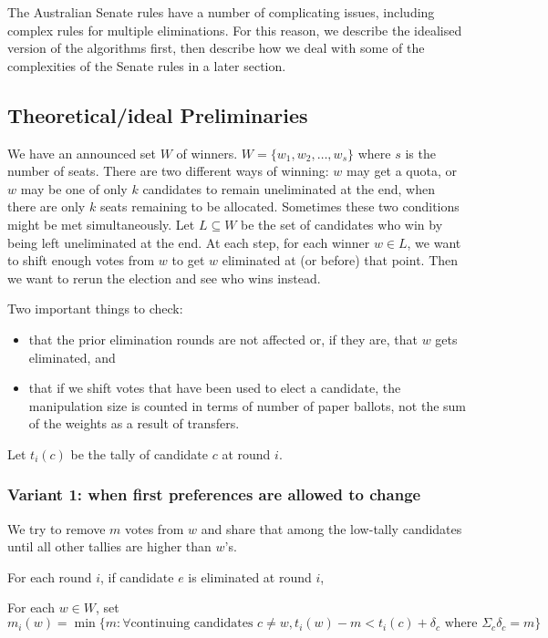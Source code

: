 \documentclass[10pt,a4paper]{article}
\begin{document}
{The Australian Senate rules have a number of complicating issues, including complex rules for multiple eliminations.  For this reason, we describe the idealised version of the algorithms first, then describe how we deal with some of the complexities of the Senate rules in a later section.

\subsection{Theoretical/ideal Preliminaries}
We have an announced set $W$ of winners.  $W = \{w_1, w_2, \ldots, w_s \}$ where $s$ is the number of seats.  There are two different ways of winning: $w$ may get a quota, or $w$ may be one of only $k$ candidates to remain uneliminated at the end, when there are only $k$ seats remaining to be allocated.  Sometimes these two conditions might be met simultaneously.  Let $L \subseteq W$ be the set of candidates who win by being left uneliminated at the end.  At each step, for each winner $w \in L$, we want to shift enough votes from $w$ to get $w$ eliminated at (or before) that point.  Then we want to rerun the election and see who wins instead.

Two important things to check:
\begin{itemize}
	\item that the prior elimination rounds are not affected or, if they are, that $w$ gets eliminated, and
	\item that if we shift votes that have been used to elect a candidate, the manipulation size is counted in terms of number of paper ballots, not the sum of the weights as a result of transfers.
\end{itemize}

Let $t_i(c)$ be the tally of candidate $c$ at round $i$.

\subsubsection{Variant 1: when first preferences are allowed to change}
We try to remove $m$ votes from $w$ and share that among the low-tally candidates until all other tallies are higher than $w$'s.

For each round $i$, if candidate $e$ is eliminated at round $i$,

For each $w \in W$, set 
\begin{equation} m_i(w) = \min \{m :  \forall \text{continuing candidates }  c \neq w, 
	t_i(w) - m < t_i(c) + \delta_c  \text{ where } \Sigma_c \delta_c = m   \}  
\label{eqn:margin} \end{equation}


}
\end{document}
